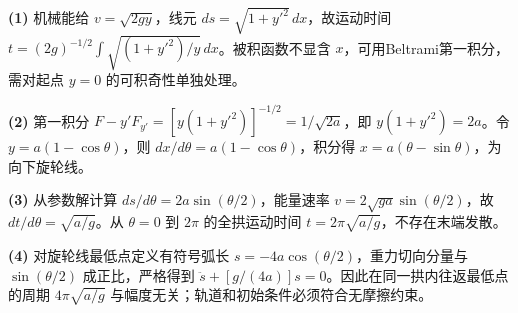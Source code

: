 \par\noindent\textbf{(1)} 机械能给 \(v=\sqrt{2gy}\)，线元 \(ds=\sqrt{1+y'^2}\,dx\)，故运动时间 \(t=(2g)^{-1/2}\int\sqrt{(1+y'^2)/y}\,dx\)。被积函数不显含 \(x\)，可用Beltrami第一积分，需对起点 \(y=0\) 的可积奇性单独处理。
\par\noindent\textbf{(2)} 第一积分 \(F-y'F_{y'}=[y(1+y'^2)]^{-1/2}=1/\sqrt{2a}\)，即 \(y(1+y'^2)=2a\)。令 \(y=a(1-\cos\theta)\)，则 \(dx/d\theta=a(1-\cos\theta)\)，积分得 \(x=a(\theta-\sin\theta)\)，为向下旋轮线。
\par\noindent\textbf{(3)} 从参数解计算 \(ds/d\theta=2a\sin(\theta/2)\)，能量速率 \(v=2\sqrt{ga}\sin(\theta/2)\)，故 \(dt/d\theta=\sqrt{a/g}\)。从 \(\theta=0\) 到 \(2\pi\) 的全拱运动时间 \(t=2\pi\sqrt{a/g}\)，不存在末端发散。
\par\noindent\textbf{(4)} 对旋轮线最低点定义有符号弧长 \(s=-4a\cos(\theta/2)\)，重力切向分量与 \(\sin(\theta/2)\) 成正比，严格得到 \(\ddot s+[g/(4a)]s=0\)。因此在同一拱内往返最低点的周期 \(4\pi\sqrt{a/g}\) 与幅度无关；轨道和初始条件必须符合无摩擦约束。
